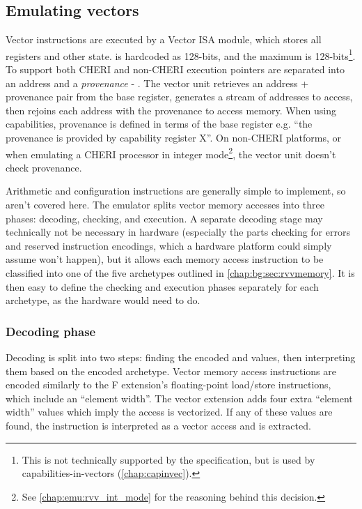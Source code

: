 \subsection{Emulating vectors}

Vector instructions are executed by a Vector ISA module, which stores all registers and other state.
 is hardcoded as 128-bits, and the maximum  is 128-bits\footnote{This is not technically supported by the specification, but is used by capabilities-in-vectors (\cref{chap:capinvec}).}.
To support both CHERI and non-CHERI execution pointers are separated into an address and a \emph{provenance} - .
The vector unit retrieves an address + provenance pair from the base register, generates a stream of addresses to access, then rejoins each address with the provenance to access memory.
When using capabilities, provenance is defined in terms of the base register e.g. \enquote{the provenance is provided by capability register X}.
On non-CHERI platforms, or when emulating a CHERI processor in integer mode\footnote{See \cref{chap:emu:rvv_int_mode} for the reasoning behind this decision.}, the vector unit doesn't check provenance.

Arithmetic and configuration instructions are generally simple to implement, so aren't covered here.
The emulator splits vector memory accesses into three phases: decoding, checking, and execution.
A separate decoding stage may technically not be necessary in hardware (especially the parts checking for errors and reserved instruction encodings, which a hardware platform could simply assume won't happen), but it allows each memory access instruction to be classified into one of the five archetypes outlined in \cref{chap:bg:sec:rvvmemory}.
It is then easy to define the checking and execution phases separately for each archetype, as the hardware would need to do.

\subsubsection{Decoding phase}\label{chap:hardware:subsec:decoding}
Decoding is split into two steps: finding the encoded  and  values, then interpreting them based on the encoded archetype.
Vector memory access instructions are encoded similarly to the F extension's floating-point load/store instructions, which include an ``element width''.
The vector extension adds four extra ``element width'' values which imply the access is vectorized.
If any of these values are found, the instruction is interpreted as a vector access and  is extracted.

